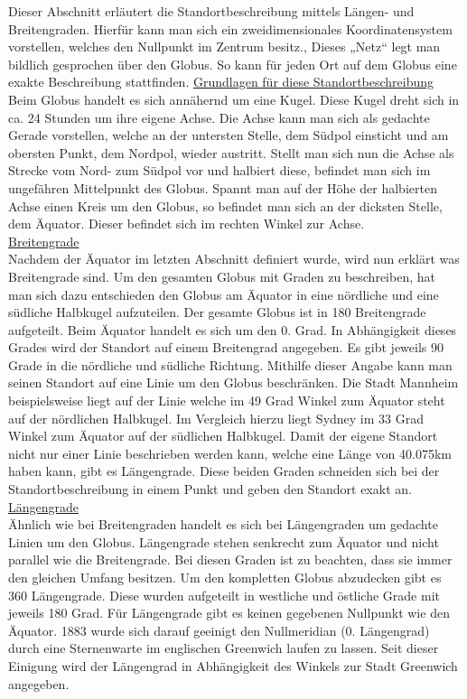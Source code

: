 Dieser Abschnitt erläutert die Standortbeschreibung mittels Längen- und Breitengraden.
Hierfür kann man sich ein zweidimensionales Koordinatensystem vorstellen, welches den Nullpunkt im Zentrum besitz., Dieses „Netz“ legt man bildlich gesprochen über den Globus. So kann für jeden Ort auf dem Globus eine exakte Beschreibung stattfinden. 
\newpage
\underline{Grundlagen für diese Standortbeschreibung}
\\Beim Globus handelt es sich annähernd um eine Kugel. Diese Kugel dreht sich in ca. 24 Stunden um ihre eigene Achse. Die Achse kann man sich als gedachte Gerade vorstellen, welche an der untersten Stelle, dem Südpol einsticht und am obersten Punkt, dem Nordpol, wieder austritt. Stellt man sich nun die Achse als Strecke vom Nord- zum Südpol vor und halbiert diese, befindet man sich im ungefähren Mittelpunkt des Globus. Spannt man auf der Höhe der halbierten Achse einen Kreis um den Globus, so befindet man sich an der dicksten Stelle, dem Äquator. Dieser befindet sich im rechten Winkel zur Achse.
\\\underline{Breitengrade}
\\Nachdem der Äquator im letzten Abschnitt definiert wurde, wird nun erklärt was Breitengrade sind. Um den gesamten Globus mit Graden zu beschreiben, hat man sich dazu entschieden den Globus am Äquator in eine nördliche und eine südliche Halbkugel aufzuteilen. Der gesamte Globus ist in 180 Breitengrade aufgeteilt. Beim Äquator handelt es sich um den 0. Grad. In Abhängigkeit dieses Grades wird der Standort auf einem Breitengrad angegeben. Es gibt jeweils 90 Grade in die nördliche und südliche Richtung. Mithilfe dieser Angabe kann man seinen Standort auf eine Linie um den Globus beschränken. Die Stadt Mannheim beispielsweise liegt auf der Linie welche im 49 Grad Winkel zum Äquator steht auf der nördlichen Halbkugel. Im Vergleich hierzu liegt Sydney im 33 Grad Winkel zum Äquator auf der südlichen Halbkugel.
Damit der eigene Standort nicht nur einer Linie beschrieben werden kann, welche eine Länge von 40.075km haben kann, gibt es Längengrade. Diese beiden Graden schneiden sich bei der Standortbeschreibung in einem Punkt und geben den Standort exakt an.
\\\underline{Längengrade}
\\Ähnlich wie bei Breitengraden handelt es sich bei Längengraden um gedachte Linien um den Globus. Längengrade stehen  senkrecht zum Äquator und nicht parallel wie die Breitengrade. Bei diesen Graden ist zu beachten, dass sie immer den gleichen Umfang besitzen. Um den kompletten Globus abzudecken gibt es 360 Längengrade. Diese wurden aufgeteilt in westliche und östliche Grade mit jeweils 180 Grad. Für Längengrade gibt es keinen gegebenen Nullpunkt wie den Äquator. 1883 wurde sich darauf geeinigt den Nullmeridian (0. Längengrad) durch eine Sternenwarte im englischen Greenwich laufen zu lassen. Seit dieser Einigung wird der Längengrad in Abhängigkeit des Winkels zur Stadt Greenwich angegeben. 
